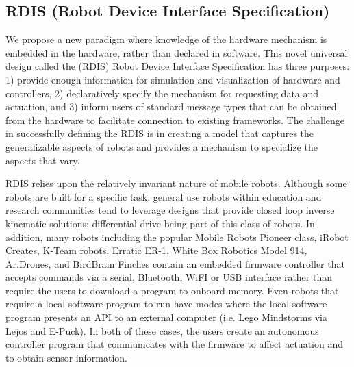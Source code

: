 \subsection{RDIS (Robot Device Interface Specification)}
We propose a new paradigm where knowledge of the hardware mechanism is embedded in the hardware, rather than declared in software.  This novel universal design called the (RDIS) Robot Device Interface Specification has three purposes: 1) provide enough information for simulation and visualization of hardware and controllers, 2) declaratively specify the mechanism for requesting data and actuation, and 3) inform users of standard message types that can be obtained from the hardware to facilitate connection to existing frameworks.  The challenge in successfully defining the RDIS is in creating a model that captures the generalizable aspects of robots and provides a mechanism to specialize the aspects that vary.

RDIS relies upon the relatively invariant nature of mobile robots.  Although some robots are built for a specific task, general use robots within education and research communities tend to leverage designs that provide closed loop inverse kinematic solutions; differential drive being part of this class of robots.  In addition, many robots including the popular Mobile Robots Pioneer class, iRobot Creates, K-Team robots, Erratic ER-1, White Box Robotics Model 914, Ar.Drones, and BirdBrain Finches
\monica{[references?]}
contain an embedded firmware controller that accepts commands via a serial, Bluetooth, WiFI or USB interface rather than require the users to download a program to onboard memory.  Even robots that require a local software program to run have modes where the local software program presents an API to an external computer (i.e. Lego Mindstorms via Lejos and E-Puck).  In both of these cases, the users create an autonomous controller program that communicates with the firmware to affect actuation and to obtain sensor information.  


